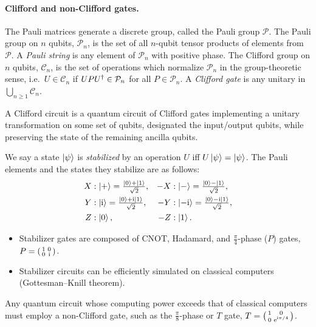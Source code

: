 \paragraph{Clifford and non-Clifford gates.}
The Pauli matrices generate a discrete group, called the Pauli group $\mathcal{P}$.
The Pauli group on $n$ qubits, $\mathcal{P}_n$, is the set of all $n$-qubit tensor
products of elements from $\mathcal{P}$. A \emph{Pauli string} is any element of
$\mathcal{P}_n$ with positive phase. The Clifford group on $n$ qubits,
$\mathcal{C}_n$, is the set of operations which normalize $\mathcal{P}_n$ in the
group-theoretic sense, i.e.\ $U \in \mathcal{C}_n$ if $U P U^{\dagger} \in \mathcal{P}_n$
for all $P \in \mathcal{P}_n$. A \emph{Clifford gate} is any unitary in
$\bigcup_{n \ge 1} \mathcal{C}_n$.

A Clifford circuit is a quantum circuit of Clifford gates implementing a unitary
transformation on some set of qubits, designated the input/output qubits, while
preserving the state of the remaining ancilla qubits.

We say a state $\ket{\psi}$ is \emph{stabilized} by an operation $U$ iff
$U\ket{\psi} = \ket{\psi}$. The Pauli elements and the states they stabilize are
as follows:
\begin{align}
  X &: \ket{+} = \tfrac{\ket{0}+\ket{1}}{\sqrt{2}}, &
  -X &: \ket{-} = \tfrac{\ket{0}-\ket{1}}{\sqrt{2}}, \\
  Y &: \ket{\mathrm{i}} = \tfrac{\ket{0}+\mathrm{i}\ket{1}}{\sqrt{2}}, &
  -Y &: \ket{-\mathrm{i}} = \tfrac{\ket{0}-\mathrm{i}\ket{1}}{\sqrt{2}}, \\
  Z &: \ket{0}, & -Z &: \ket{1}.
\end{align}
\begin{itemize}
  \item Stabilizer gates are composed of CNOT, Hadamard, and $\tfrac{\pi}{4}$-phase
    ($P$) gates, $P = \begin{psmallmatrix} 1 & 0 \\ 0 & \mathrm{i} \end{psmallmatrix}$.
  \item Stabilizer circuits can be efficiently simulated on classical computers
    (Gottesman--Knill theorem).
\end{itemize}
Any quantum circuit whose computing power exceeds that of classical computers
must employ a non-Clifford gate, such as the $\tfrac{\pi}{8}$-phase or $T$ gate,
$T = \begin{psmallmatrix} 1 & 0 \\ 0 & \mathrm{e}^{\mathrm{i}\pi/4} \end{psmallmatrix}$.

